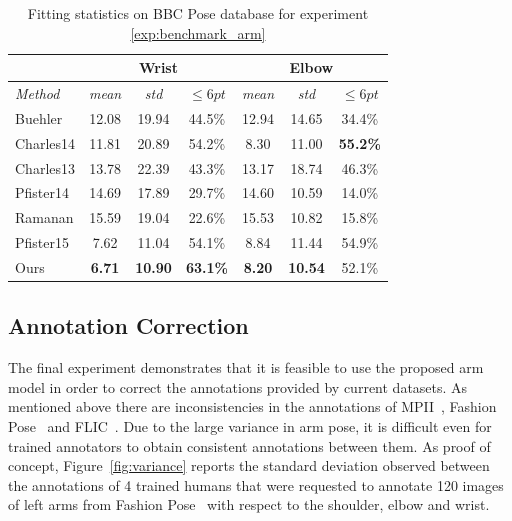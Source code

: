 \begin{table}
    \small
    \centering
    \begin{tabular}{|l|c|c|c||c|c|c|}
        \hline
                            & \multicolumn{3}{c||}{Wrist} & \multicolumn{3}{c|}{Elbow}\\
        \hline
        \emph{Method}       & \emph{mean} & \emph{std} & $\leq 6pt$ & \emph{mean} & \emph{std} & $\leq 6pt$\\
        \hline\hline
        Buehler             & 12.08    & 19.94        & 44.5\%       & 12.94    & 14.65        & 34.4\%\\
        Charles14           & 11.81    & 20.89        & 54.2\%       &  8.30    & 11.00        & \textbf{55.2\%}\\
        Charles13           & 13.78    & 22.39        & 43.3\%       & 13.17    & 18.74        & 46.3\%\\
        Pfister14           & 14.69    & 17.89        & 29.7\%       & 14.60    & 10.59        & 14.0\%\\
        Ramanan             & 15.59    & 19.04        & 22.6\%       & 15.53    & 10.82        & 15.8\%\\
        Pfister15           & 7.62     & 11.04        & 54.1\%       &  8.84    & 11.44        & 54.9\%\\
        \hline\hline
        Ours                & \textbf{6.71}& \textbf{10.90}   & \textbf{63.1\%}       & \textbf{8.20}     &  \textbf{10.54}        & 52.1\%\\
        \hline
    \end{tabular}
    \caption{Fitting statistics on BBC Pose database for experiment \ref{exp:benchmark_arm}}
    \label{tab:hand_benchmark}
\end{table}



\subsection{Annotation Correction}
\label{exp:qualitative}

The final experiment demonstrates that it is feasible to use the proposed arm model in order to correct the annotations provided by current datasets. As mentioned above there are inconsistencies in the annotations of MPII~\cite{andriluka14cvpr}, Fashion Pose~\cite{dantone2013human} and FLIC~\cite{sapp2013modec}. Due to the large variance in arm pose, it is difficult even for trained annotators to obtain consistent annotations between them. As proof of concept, Figure~\ref{fig:variance} reports the standard deviation observed between the annotations of 4 trained humans that were requested to annotate 120 images of left arms from Fashion Pose~\cite{dantone2013human} with respect to the shoulder, elbow and wrist.

